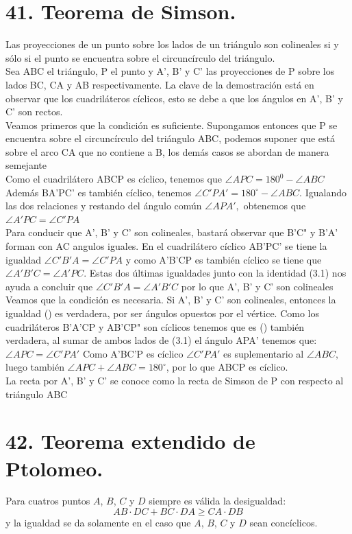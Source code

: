 \documentclass[12pt,a4paper, oneside]{book}
\begin{document}
\section{41. Teorema de Simson.}
Las proyecciones de un punto sobre los lados de un triángulo son colineales si y sólo si el punto se encuentra sobre el circuncírculo del triángulo.
\\
Sea ABC el triángulo, P el punto y A', B' y C' las proyecciones de P sobre los lados BC, CA y AB respectivamente. La clave de la demostración está en observar que los cuadriláteros cíclicos, esto se debe a que los ángulos en A', B' y C' son rectos.
\\Veamos primeros que la condición es suficiente. Supongamos entonces que P se encuentra sobre el circuncírculo  del triángulo ABC, podemos suponer que está sobre el arco CA que no contiene a B, los demás casos se abordan de manera semejante
\\Como el cuadrilátero ABCP es cíclico, tenemos que $\angle APC= 180^0 - \angle ABC$ Además  BA'PC' es también cíclico, tenemos $\angle C'PA'= 180^\circ - \angle ABC.$ Igualando las dos relaciones y restando del ángulo común $\angle APA',$ obtenemos que $\angle A'PC = \angle C'PA$
\\Para conducir que A', B' y C' son colineales, bastará observar que  B'C" y B'A' forman con AC angulos iguales. En el cuadrilátero cíclico AB'PC' se tiene la igualdad $\angle C'B'A =\angle C'PA$ y como A'B'CP es también cíclico se tiene que $\angle A'B'C = \angle A'PC$. Estas dos últimas igualdades junto con la identidad (3.1) nos ayuda a concluir que $ \angle C'B'A = \angle A'B'C$ por lo que A', B' y C' son colineales
\\Veamos que la condición es necesaria. Si A', B' y C' son colineales, entonces la igualdad () es verdadera, por ser ángulos opuestos por el vértice. Como los cuadriláteros B'A'CP y AB'CP" son cíclicos tenemos que es () también  verdadera, al sumar de ambos lados de (3.1) el ángulo APA' tenemos que: $\angle APC = \angle C'PA'$ Como A'BC'P es cíclico $\angle C'PA'$ es suplementario al $\angle ABC,$ luego también $\angle APC + \angle ABC = 180 ^\circ$, por lo que ABCP es cíclico.
\\La recta por A', B' y C' se conoce como la recta de Simson de P con respecto al triángulo ABC
 
\section{42. Teorema extendido de Ptolomeo.}
Para cuatros puntos $A$, $B$, $C$ y $D$ siempre es válida la desigualdad:$$AB \cdot DC + BC\cdot DA \geq CA \cdot DB$$ y la igualdad se da solamente en el caso que $A$, $B$, $C$ y $D$ sean concíclicos.
\end{document}
